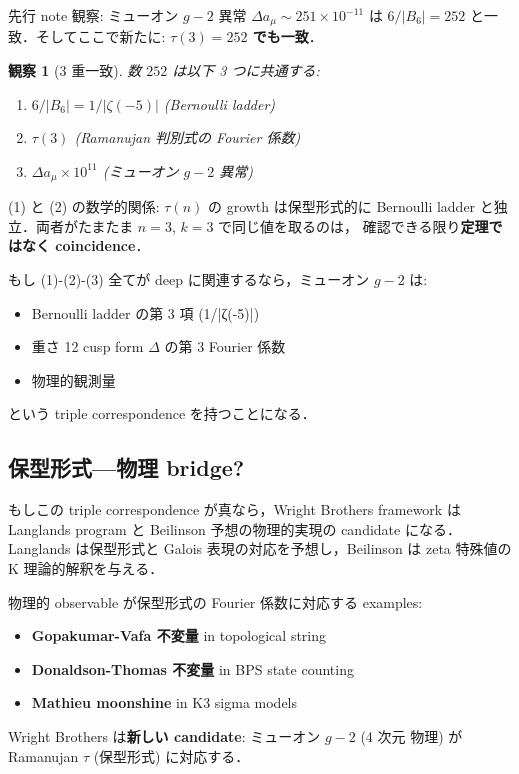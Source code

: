 \documentclass[11pt,a4paper]{article}
\newtheorem{observation}{観察}
\begin{document}
先行 note 観察: ミューオン $g-2$ 異常 $\Delta a_\mu \sim 251 \times 10^{-11}$ は
$6/|B_6| = 252$ と一致．そしてここで新たに: \textbf{$\tau(3) = 252$
でも一致}．

\begin{observation}[3 重一致]
数 $252$ は以下 3 つに共通する:
\begin{enumerate}
\item $6/|B_6| = 1/|\zeta(-5)|$ (Bernoulli ladder)
\item $\tau(3)$ (Ramanujan 判別式の Fourier 係数)
\item $\Delta a_\mu \times 10^{11}$ (ミューオン $g-2$ 異常)
\end{enumerate}
\end{observation}

(1) と (2) の数学的関係: $\tau(n)$ の growth は保型形式的に Bernoulli
ladder と独立．両者がたまたま $n=3$, $k=3$ で同じ値を取るのは，
確認できる限り\textbf{定理ではなく coincidence}．

もし (1)-(2)-(3) 全てが deep に関連するなら，ミューオン $g-2$ は:
\begin{itemize}
\item Bernoulli ladder の第 3 項 (1/|ζ(-5)|)
\item 重さ 12 cusp form $\Delta$ の第 3 Fourier 係数
\item 物理的観測量
\end{itemize}
という triple correspondence を持つことになる．

\subsection{保型形式—物理 bridge?}

もしこの triple correspondence が真なら，Wright Brothers framework は
Langlands program と Beilinson 予想の物理的実現の candidate になる．
Langlands は保型形式と Galois 表現の対応を予想し，Beilinson は
zeta 特殊値の K 理論的解釈を与える．

物理的 observable が保型形式の Fourier 係数に対応する examples:
\begin{itemize}
\item \textbf{Gopakumar-Vafa 不変量} in topological string~\cite{Marino2011}
\item \textbf{Donaldson-Thomas 不変量} in BPS state counting
\item \textbf{Mathieu moonshine} in K3 sigma models~\cite{EguchiOoguri2010}
\end{itemize}

Wright Brothers は\textbf{新しい candidate}: ミューオン $g-2$ (4 次元
物理) が Ramanujan $\tau$ (保型形式) に対応する．
\end{document}
